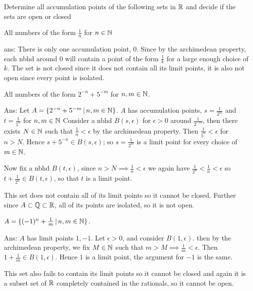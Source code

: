 


    \maketitle 

    \question
    Determine all accumulation points of the following sets in $\mathbb{R}$ and decide if 
    the sets are open or closed
    \begin{alphaparts}
        \questionpart 
        All numbers of the form $\frac{1}{n}$ for $n \in \mathbb{N}$ 

        ans: There is only one accumulation point, $0$. Since 
        by the archimedean property, each nbhd around $0$ will contain 
        a point of the form $\frac{1}{k}$ for a large enough choice of $k$. 
        The set is not closed since it does not contain all its limit points, 
        it is also not open since every point is isolated. 

        \questionpart 
        All numbers of the form $2^{-n} + 5^{-m}$ for $n,m \in \mathbb{N}$. 

        Ans: Let $A = \{2^{-n} + 5^{-m} \, | \, n, m \in \mathbb{N} \}$. 
       $A$ has accumulation points, $s = \frac{1}{2^{m}}$ and $t = \frac{1}{5^{n}}$ for $n,m \in \mathbb{N}$
       Consider a nbhd $B(s, \epsilon)$ for  $\epsilon > 0$ around $\frac{1}{2^{-m}}$, then there exists $N \in \mathbb{N}$ such that $\frac{1}{n} < \epsilon$ 
       by the archimedean property. Then $\frac{1}{5^n} < \epsilon$ for $n > N$. Hence $s + 5^{-n} \in B(s, \epsilon)$; 
       so $s = \frac{1}{2^m}$ is a limit point for every choice of $m \in \mathbb{N}$. 

       Now fix a nbhd $B(t, \epsilon)$, since $n > N \implies \frac{1}{n} < \epsilon$ we again 
       have $\frac{1}{2^n} < \frac{1}{n} < \epsilon$ so $t + \frac{1}{2^n} \in B(t, \epsilon)$, 
       so that $t$ is a limit point. 

       This set does not contain all of its limit points so it cannot be closed. Further since $A \subset \mathbb{Q} \subset \mathbb{R}$, 
       all of its points are isolated, so it is not open. 

       \questionpart 
       $A = \{(-1)^n + \frac{1}{m} \, | \, n, m \in \mathbb{N}\}$.
       
       Ans: $A$ has limit points $1, -1$. Let $\epsilon > 0$, and consider $B(1,\epsilon)$. 
       then by the archimedean property, we fix $M \in \mathbb{N}$ such that $m > M \implies \frac{1}{m} < \epsilon$. 
       Then $1 + \frac{1}{m} \in B(1, \epsilon)$. Hence $1$ is a limit point, the argument for $-1$ is the same. 


       This set also fails to contain its limit points so it cannot be closed and again it is a subset set of $\mathbb{R}$ completely contained 
       in the rationals, so it cannot be open. 

    \end{alphaparts}

